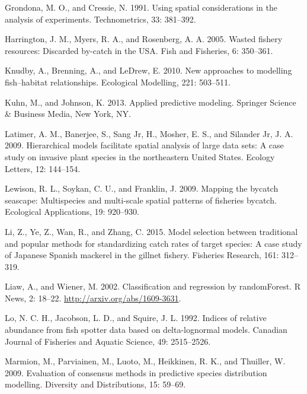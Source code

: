 \documentclass[]{article}
\begin{document}
\leavevmode\hypertarget{ref-grondona1991}{}%
Grondona, M. O., and Cressie, N. 1991. Using spatial considerations in
the analysis of experiments. Technometrics, 33: 381--392.

\leavevmode\hypertarget{ref-harrington2005}{}%
Harrington, J. M., Myers, R. A., and Rosenberg, A. A. 2005. Wasted
fishery resources: Discarded by-catch in the USA. Fish and Fisheries, 6:
350--361.

\leavevmode\hypertarget{ref-knudby2010}{}%
Knudby, A., Brenning, A., and LeDrew, E. 2010. New approaches to
modelling fish--habitat relationships. Ecological Modelling, 221:
503--511.

\leavevmode\hypertarget{ref-kuhn2013}{}%
Kuhn, M., and Johnson, K. 2013. Applied predictive modeling. Springer
Science \& Business Media, New York, NY.

\leavevmode\hypertarget{ref-latimer2009}{}%
Latimer, A. M., Banerjee, S., Sang Jr, H., Mosher, E. S., and Silander
Jr, J. A. 2009. Hierarchical models facilitate spatial analysis of large
data sets: A case study on invasive plant species in the northeastern
United States. Ecology Letters, 12: 144--154.

\leavevmode\hypertarget{ref-lewison2009}{}%
Lewison, R. L., Soykan, C. U., and Franklin, J. 2009. Mapping the
bycatch seascape: Multispecies and multi-scale spatial patterns of
fisheries bycatch. Ecological Applications, 19: 920--930.

\leavevmode\hypertarget{ref-li2015}{}%
Li, Z., Ye, Z., Wan, R., and Zhang, C. 2015. Model selection between
traditional and popular methods for standardizing catch rates of target
species: A case study of Japanese Spanish mackerel in the gillnet
fishery. Fisheries Research, 161: 312--319.

\leavevmode\hypertarget{ref-liaw2002}{}%
Liaw, A., and Wiener, M. 2002. Classification and regression by
randomForest. R News, 2: 18--22. \url{http://arxiv.org/abs/1609-3631}.

\leavevmode\hypertarget{ref-lo1992}{}%
Lo, N. C. H., Jacobson, L. D., and Squire, J. L. 1992. Indices of
relative abundance from fish spotter data based on delta-lognormal
models. Canadian Journal of Fisheries and Aquatic Science, 49:
2515--2526.

\leavevmode\hypertarget{ref-marmion2009}{}%
Marmion, M., Parviainen, M., Luoto, M., Heikkinen, R. K., and Thuiller,
W. 2009. Evaluation of consensus methods in predictive species
distribution modelling. Diversity and Distributions, 15: 59--69.
\end{document}
